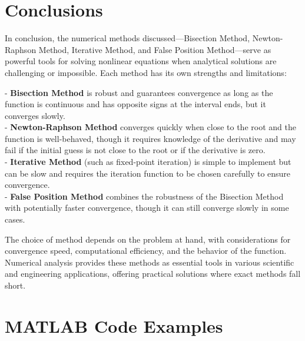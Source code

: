 \documentclass[12pt,a4paper]{article}
\begin{document}
		
		
		
		

	
	
	
	\newpage
	\section{ Conclusions}

In conclusion, the numerical methods discussed—Bisection Method, Newton-Raphson Method, Iterative Method, and False Position Method—serve as powerful tools for solving nonlinear equations when analytical solutions are challenging or impossible. Each method has its own strengths and limitations:

- \textbf{Bisection Method} is robust and guarantees convergence as long as the function is continuous and has opposite signs at the interval ends, but it converges slowly. \\
- \textbf{Newton-Raphson Method} converges quickly when close to the root and the function is well-behaved, though it requires knowledge of the derivative and may fail if the initial guess is not close to the root or if the derivative is zero. \\
- \textbf{Iterative Method} (such as fixed-point iteration) is simple to implement but can be slow and requires the iteration function to be chosen carefully to ensure convergence. \\
- \textbf{False Position Method} combines the robustness of the Bisection Method with potentially faster convergence, though it can still converge slowly in some cases.

The choice of method depends on the problem at hand, with considerations for convergence speed, computational efficiency, and the behavior of the function. Numerical analysis provides these methods as essential tools in various scientific and engineering applications, offering practical solutions where exact methods fall short.
	

\newpage

\appendix
\small
\section{MATLAB Code Examples}
\end{document}
